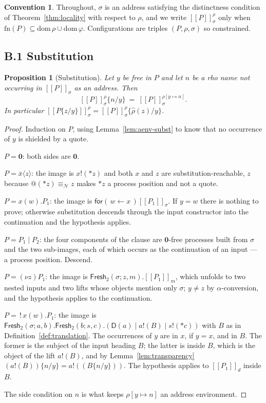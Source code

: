 \documentclass[11pt]{article}
\makeatletter
\theoremstyle{definition}
\newtheorem{convention}[definition]{Convention}
\theoremstyle{plain}
\newtheorem{proposition}[definition]{Proposition}
\theoremstyle{remark}
\newcommand{\quo}[1]{@#1}
\newcommand{\drp}[1]{{*}#1}
\newcommand{\inp}[3]{\mathsf{for}(\,#1 \leftarrow #2\,)#3}
\newcommand{\out}[2]{#1!(#2)}
\newcommand{\enc}[1]{[\![#1]\!]}
\newcommand{\nequiv}{\equiv_{\mathcal{N}}}
\newcommand{\nil}{\mathbf{0}}
\newcommand{\Frsh}{\mathsf{Fresh}_2}
\newcommand{\Dup}{\mathsf{D}}
\newcommand{\dom}{\mathrm{dom}\,}
\newcommand{\fn}{\mathrm{fn}}
\makeatother
\begin{document}
\begin{convention}
Throughout, $\sigma$ is an address satisfying the distinctness condition
of Theorem~\ref{thm:locality} with respect to $\rho$, and we write
$\enc{P}^\rho_\sigma$ only when $\fn(P) \subseteq \dom\rho \cup \dom\varphi$.
Configurations are triples $(P,\rho,\sigma)$ so constrained.
\end{convention}

\subsection{B.1 Substitution}

\begin{proposition}[Substitution]\label{prop:subst}
Let $y$ be free in $P$ and let $n$ be a rho name not occurring in
$\enc{P}_\sigma$ as an address. Then
\[
  \enc{P}^\rho_\sigma\{n/y\} \ = \ \enc{P}^{\rho[y\mapsto n]}_\sigma .
\]
In particular $\enc{P\{z/y\}}^\rho_\sigma = \enc{P}^\rho_\sigma\{\hat\rho(z)/y\}$.
\end{proposition}

\begin{proof}
Induction on $P$, using Lemma~\ref{lem:aenv-subst} to know that no
occurrence of $y$ is shielded by a quote.

$P = \nil$: both sides are $\nil$.

$P = \bar x\langle z\rangle$: the image is $\out{x}{\drp{z}}$ and both $x$
and $z$ are substitution-reachable, $z$ because
$\quo{(\drp{z})} \nequiv z$ makes $\drp{z}$ a process position and not a
quote.

$P = x(w).P_1$: the image is $\inp{w}{x}{\enc{P_1}_\sigma}$. If $y = w$
there is nothing to prove; otherwise substitution descends through the
input constructor into the continuation and the hypothesis applies.

$P = P_1 \mid P_2$: the four components of the clause are $\nil$-free
processes built from $\sigma$ and the two sub-images, each of which
occurs as the continuation of an input --- a process position. Descend.

$P = (\nu z)P_1$: the image is $\Frsh(\sigma;z,m).\enc{P_1}_m$, which
unfolds to two nested inputs and two lifts whose objects mention only
$\sigma$; $y \neq z$ by $\alpha$-conversion, and the hypothesis applies to
the continuation.

$P = \,!\,x(w).P_1$: the image is
$\Frsh(\sigma;a,b).\Frsh(b;s,c).(\Dup(a) \mid \out{a}{B} \mid \out{s}{\drp{c}})$
with $B$ as in Definition~\ref{def:translation}. The occurrences of $y$
are in $x$, if $y = x$, and in $B$. The former is the subject of the
input heading $B$; the latter is inside $B$, which is the object of the
lift $\out{a}{B}$, and by Lemma~\ref{lem:transparency}
$(\out{a}{B})\{n/y\} = \out{a}{(B\{n/y\})}$. The hypothesis applies to
$\enc{P_1}_d$ inside $B$.

The side condition on $n$ is what keeps $\rho[y\mapsto n]$ an address
environment.
\end{proof}
\end{document}
